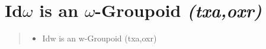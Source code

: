 
\section{Id$\omega$ is an $\omega$-Groupoid \textit{(txa,oxr)}}
\label{sec:idw}

\begin{quote}
  \begin{itemize}
  \item Idw is an w-Groupoid (txa,oxr)
  \end{itemize}
\end{quote}
